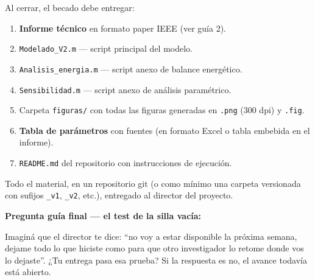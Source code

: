 \documentclass[11pt,a4paper]{article}
\begin{document}
Al cerrar, el becado debe entregar:

\begin{enumerate}
    \item \textbf{Informe técnico} en formato paper IEEE (ver guía 2).
    \item \texttt{Modelado\_V2.m} --- script principal del modelo.
    \item \texttt{Analisis\_energia.m} --- script anexo de balance energético.
    \item \texttt{Sensibilidad.m} --- script anexo de análisis paramétrico.
    \item Carpeta \texttt{figuras/} con todas las figuras generadas en \texttt{.png} (300 dpi) y \texttt{.fig}.
    \item \textbf{Tabla de parámetros} con fuentes (en formato Excel o tabla embebida en el informe).
    \item \texttt{README.md} del repositorio con instrucciones de ejecución.
\end{enumerate}

Todo el material, en un repositorio git (o como mínimo una carpeta versionada con sufijos \texttt{\_v1}, \texttt{\_v2}, etc.), entregado al director del proyecto.

\begin{guia}
\textbf{Pregunta guía final --- el test de la silla vacía:}

Imaginá que el director te dice: ``no voy a estar disponible la próxima semana, dejame todo lo que hiciste como para que otro investigador lo retome donde vos lo dejaste''. ¿Tu entrega pasa esa prueba? Si la respuesta es no, el avance todavía está abierto.
\end{guia}
\end{document}

